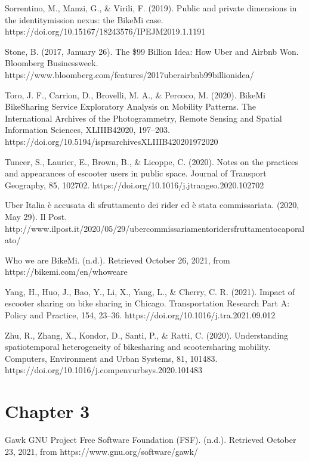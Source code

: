\documentclass[letterpaper,10pt,english]{jupyterBook}
\begin{document}
\sphinxAtStartPar
Sorrentino, M., Manzi, G., \& Virili, F. (2019). Public and private dimensions in the identity\sphinxhyphen{}mission nexus: the BikeMi case. https://doi.org/10.15167/1824\sphinxhyphen{}3576/IPEJM2019.1.1191

\sphinxAtStartPar
Stone, B. (2017, January 26). The \$99 Billion Idea: How Uber and Airbnb Won. Bloomberg Businessweek. https://www.bloomberg.com/features/2017\sphinxhyphen{}uber\sphinxhyphen{}airbnb\sphinxhyphen{}99\sphinxhyphen{}billion\sphinxhyphen{}idea/

\sphinxAtStartPar
Toro, J. F., Carrion, D., Brovelli, M. A., \& Percoco, M. (2020). BikeMi Bike\sphinxhyphen{}Sharing Service Exploratory Analysis on Mobility Patterns. The International Archives of the Photogrammetry, Remote Sensing and Spatial Information Sciences, XLIII\sphinxhyphen{}B4\sphinxhyphen{}2020, 197–203. https://doi.org/10.5194/isprs\sphinxhyphen{}archives\sphinxhyphen{}XLIII\sphinxhyphen{}B4\sphinxhyphen{}2020\sphinxhyphen{}197\sphinxhyphen{}2020

\sphinxAtStartPar
Tuncer, S., Laurier, E., Brown, B., \& Licoppe, C. (2020). Notes on the practices and appearances of e\sphinxhyphen{}scooter users in public space. Journal of Transport Geography, 85, 102702. https://doi.org/10.1016/j.jtrangeo.2020.102702

\sphinxAtStartPar
Uber Italia è accusata di sfruttamento dei rider ed è stata commissariata. (2020, May 29). Il Post. http://www.ilpost.it/2020/05/29/uber\sphinxhyphen{}commissariamento\sphinxhyphen{}rider\sphinxhyphen{}sfruttamento\sphinxhyphen{}caporalato/

\sphinxAtStartPar
Who we are \sphinxhyphen{} BikeMi. (n.d.). Retrieved October 26, 2021, from https://bikemi.com/en/who\sphinxhyphen{}we\sphinxhyphen{}are

\sphinxAtStartPar
Yang, H., Huo, J., Bao, Y., Li, X., Yang, L., \& Cherry, C. R. (2021). Impact of e\sphinxhyphen{}scooter sharing on bike sharing in Chicago. Transportation Research Part A: Policy and Practice, 154, 23–36. https://doi.org/10.1016/j.tra.2021.09.012

\sphinxAtStartPar
Zhu, R., Zhang, X., Kondor, D., Santi, P., \& Ratti, C. (2020). Understanding spatio\sphinxhyphen{}temporal heterogeneity of bike\sphinxhyphen{}sharing and scooter\sphinxhyphen{}sharing mobility. Computers, Environment and Urban Systems, 81, 101483. https://doi.org/10.1016/j.compenvurbsys.2020.101483


\section{Chapter 3}
\label{\detokenize{references:chapter-3}}
\sphinxAtStartPar
Gawk \sphinxhyphen{} GNU Project \sphinxhyphen{} Free Software Foundation (FSF). (n.d.). Retrieved October 23, 2021, from https://www.gnu.org/software/gawk/
\end{document}
